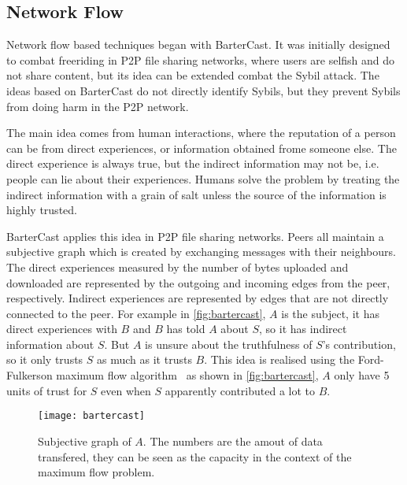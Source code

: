 
\subsection{Network Flow}\label{sec:network-flow}
Network flow based techniques began with
BarterCast\cite{meulpolder2009bartercast}. It was initially designed to combat
freeriding in P2P file sharing networks, where users are selfish and do not
share content, but its idea can be extended combat the Sybil attack. The ideas
based on BarterCast do not directly identify Sybils, but they prevent Sybils
from doing harm in the P2P network.

The main idea comes from human interactions, where the reputation of a person
can be from direct experiences, or information obtained frome someone else. The
direct experience is always true, but the indirect information may not be, i.e.
people can lie about their experiences. Humans solve the problem by treating the
indirect information with a grain of salt unless the source of the information
is highly trusted.

BarterCast applies this idea in P2P file sharing networks. Peers all maintain a
subjective graph which is created by exchanging messages with their neighbours.
The direct experiences measured by the number of bytes uploaded and downloaded
are represented by the outgoing and incoming edges from the peer, respectively.
Indirect experiences are represented by edges that are not directly connected to
the peer. For example in \autoref{fig:bartercast}, $A$ is the subject, it has
direct experiences with $B$ and $B$ has told $A$ about $S$, so it has indirect
information about $S$. But $A$ is unsure about the truthfulness of $S$'s
contribution, so it only trusts $S$ as much as it trusts $B$. This idea is
realised using the Ford-Fulkerson maximum flow
algorithm~\cite{thomas2001introduction} as shown in \autoref{fig:bartercast},
$A$ only have 5 units of trust for $S$ even when $S$ apparently contributed a
lot to $B$.

\begin{figure}
  \centering
  \texttt{[image: bartercast]}
  \caption{Subjective graph of $A$. The numbers are the amout of data transfered,
    they can be seen as the capacity in the context of the maximum flow
    problem.}
  \label{fig:bartercast}
\end{figure}

